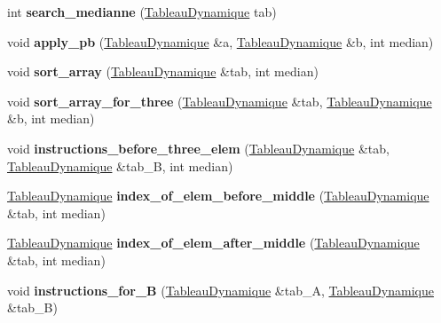 \begin{DoxyCompactItemize}
\item 
int {\bfseries search\+\_\+medianne} (\hyperlink{classTableauDynamique}{Tableau\+Dynamique} tab)\hypertarget{classSort_ab0e2a240cad981fcfcc956148e4e1fd6}{}\label{classSort_ab0e2a240cad981fcfcc956148e4e1fd6}

\item 
void {\bfseries apply\+\_\+pb} (\hyperlink{classTableauDynamique}{Tableau\+Dynamique} \&a, \hyperlink{classTableauDynamique}{Tableau\+Dynamique} \&b, int median)\hypertarget{classSort_af90a2448bfaa50f97b3e25887cceac26}{}\label{classSort_af90a2448bfaa50f97b3e25887cceac26}

\item 
void {\bfseries sort\+\_\+array} (\hyperlink{classTableauDynamique}{Tableau\+Dynamique} \&tab, int median)\hypertarget{classSort_abf7b3f918d5d6a566460b320f06a29c7}{}\label{classSort_abf7b3f918d5d6a566460b320f06a29c7}

\item 
void {\bfseries sort\+\_\+array\+\_\+for\+\_\+three} (\hyperlink{classTableauDynamique}{Tableau\+Dynamique} \&tab, \hyperlink{classTableauDynamique}{Tableau\+Dynamique} \&b, int median)\hypertarget{classSort_a09252643c8b3ee9d19b56210c8f35ca3}{}\label{classSort_a09252643c8b3ee9d19b56210c8f35ca3}

\item 
void {\bfseries instructions\+\_\+before\+\_\+three\+\_\+elem} (\hyperlink{classTableauDynamique}{Tableau\+Dynamique} \&tab, \hyperlink{classTableauDynamique}{Tableau\+Dynamique} \&tab\+\_\+B, int median)\hypertarget{classSort_aeaf2d1965a730e31956e99b02d74d80a}{}\label{classSort_aeaf2d1965a730e31956e99b02d74d80a}

\item 
\hyperlink{classTableauDynamique}{Tableau\+Dynamique} {\bfseries index\+\_\+of\+\_\+elem\+\_\+before\+\_\+middle} (\hyperlink{classTableauDynamique}{Tableau\+Dynamique} \&tab, int median)\hypertarget{classSort_a6e141ca80540553459d58d0ce70f4312}{}\label{classSort_a6e141ca80540553459d58d0ce70f4312}

\item 
\hyperlink{classTableauDynamique}{Tableau\+Dynamique} {\bfseries index\+\_\+of\+\_\+elem\+\_\+after\+\_\+middle} (\hyperlink{classTableauDynamique}{Tableau\+Dynamique} \&tab, int median)\hypertarget{classSort_a42463018142516b9e540b94938e19c63}{}\label{classSort_a42463018142516b9e540b94938e19c63}

\item 
void {\bfseries instructions\+\_\+for\+\_\+B} (\hyperlink{classTableauDynamique}{Tableau\+Dynamique} \&tab\+\_\+A, \hyperlink{classTableauDynamique}{Tableau\+Dynamique} \&tab\+\_\+B)\hypertarget{classSort_ad0e0b4ed29b4b6d6924a3e62af5aa154}{}\label{classSort_ad0e0b4ed29b4b6d6924a3e62af5aa154}


\end{DoxyCompactItemize}
